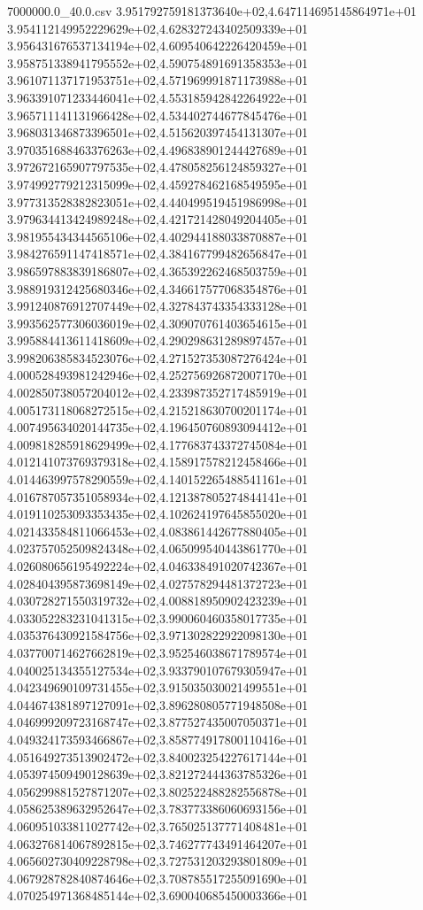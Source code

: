 \begin{filecontents*}{7000000.0_40.0.csv}
3.951792759181373640e+02,4.647114695145864971e+01
3.954112149952229629e+02,4.628327243402509339e+01
3.956431676537134194e+02,4.609540642226420459e+01
3.958751338941795552e+02,4.590754891691358353e+01
3.961071137171953751e+02,4.571969991871173988e+01
3.963391071233446041e+02,4.553185942842264922e+01
3.965711141131966428e+02,4.534402744677845476e+01
3.968031346873396501e+02,4.515620397454131307e+01
3.970351688463376263e+02,4.496838901244427689e+01
3.972672165907797535e+02,4.478058256124859327e+01
3.974992779212315099e+02,4.459278462168549595e+01
3.977313528382823051e+02,4.440499519451986998e+01
3.979634413424989248e+02,4.421721428049204405e+01
3.981955434344565106e+02,4.402944188033870887e+01
3.984276591147418571e+02,4.384167799482656847e+01
3.986597883839186807e+02,4.365392262468503759e+01
3.988919312425680346e+02,4.346617577068354876e+01
3.991240876912707449e+02,4.327843743354333128e+01
3.993562577306036019e+02,4.309070761403654615e+01
3.995884413611418609e+02,4.290298631289897457e+01
3.998206385834523076e+02,4.271527353087276424e+01
4.000528493981242946e+02,4.252756926872007170e+01
4.002850738057204012e+02,4.233987352717485919e+01
4.005173118068272515e+02,4.215218630700201174e+01
4.007495634020144735e+02,4.196450760893094412e+01
4.009818285918629499e+02,4.177683743372745084e+01
4.012141073769379318e+02,4.158917578212458466e+01
4.014463997578290559e+02,4.140152265488541161e+01
4.016787057351058934e+02,4.121387805274844141e+01
4.019110253093353435e+02,4.102624197645855020e+01
4.021433584811066453e+02,4.083861442677880405e+01
4.023757052509824348e+02,4.065099540443861770e+01
4.026080656195492224e+02,4.046338491020742367e+01
4.028404395873698149e+02,4.027578294481372723e+01
4.030728271550319732e+02,4.008818950902423239e+01
4.033052283231041315e+02,3.990060460358017735e+01
4.035376430921584756e+02,3.971302822922098130e+01
4.037700714627662819e+02,3.952546038671789574e+01
4.040025134355127534e+02,3.933790107679305947e+01
4.042349690109731455e+02,3.915035030021499551e+01
4.044674381897127091e+02,3.896280805771948508e+01
4.046999209723168747e+02,3.877527435007050371e+01
4.049324173593466867e+02,3.858774917800110416e+01
4.051649273513902472e+02,3.840023254227617144e+01
4.053974509490128639e+02,3.821272444363785326e+01
4.056299881527871207e+02,3.802522488282556878e+01
4.058625389632952647e+02,3.783773386060693156e+01
4.060951033811027742e+02,3.765025137771408481e+01
4.063276814067892815e+02,3.746277743491464207e+01
4.065602730409228798e+02,3.727531203293801809e+01
4.067928782840874646e+02,3.708785517255091690e+01
4.070254971368485144e+02,3.690040685450003366e+01

\end{filecontents*}
